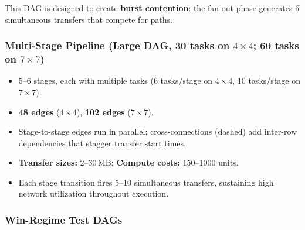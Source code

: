 \documentclass[11pt]{article}
\begin{document}
This DAG is designed to create \textbf{burst contention}: the fan-out phase
generates 6 simultaneous transfers that compete for paths.

\subsubsection{Multi-Stage Pipeline (Large DAG, 30 tasks on $4\times4$; 60 tasks on $7\times7$)}

\begin{center}
\end{center}

\begin{itemize}
  \item 5--6 stages, each with multiple tasks (6 tasks/stage on $4\times4$, 10 tasks/stage
        on $7\times7$).
  \item \textbf{48 edges} ($4\times4$), \textbf{102 edges} ($7\times7$).
  \item Stage-to-stage edges run in parallel; cross-connections (dashed) add
        inter-row dependencies that stagger transfer start times.
  \item \textbf{Transfer sizes:} 2--30\,MB; \textbf{Compute costs:} 150--1000 units.
  \item Each stage transition fires 5--10 simultaneous transfers, sustaining
        high network utilization throughout execution.
\end{itemize}

\subsubsection{Win-Regime Test DAGs}
\end{document}
